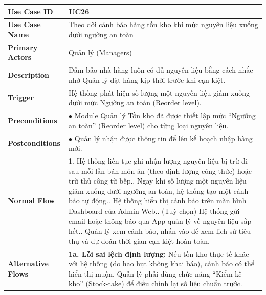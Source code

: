 \begin{longtable}{|L{3.5cm}|L{12.5cm}|}
\hline
\textbf{Use Case ID} & UC26 \\ \hline
\textbf{Use Case Name} & Theo dõi cảnh báo hàng tồn kho khi mức nguyên liệu xuống dưới ngưỡng an toàn \\ \hline
\textbf{Primary Actors} & Quản lý (Managers) \\ \hline
\textbf{Description} & Đảm bảo nhà hàng luôn có đủ nguyên liệu bằng cách nhắc nhở Quản lý đặt hàng kịp thời trước khi cạn kiệt. \\ \hline
\textbf{Trigger} & Hệ thống phát hiện số lượng một nguyên liệu giảm xuống dưới mức Ngưỡng an toàn (Reorder level). \\ \hline
\textbf{Preconditions} & $\bullet$ Module Quản lý Tồn kho đã được thiết lập mức ``Ngưỡng an toàn'' (Reorder level) cho từng loại nguyên liệu. \\ \hline
\textbf{Postconditions} & $\bullet$ Quản lý nhận được thông tin để lên kế hoạch nhập hàng mới. \\ \hline
\textbf{Normal Flow} &
1. Hệ thống liên tục ghi nhận lượng nguyên liệu bị trừ đi sau mỗi lần bán món ăn (theo định lượng công thức) hoặc trừ thủ công từ bếp.. Ngay khi số lượng một nguyên liệu giảm xuống dưới ngưỡng an toàn, hệ thống tạo một cảnh báo tự động.. Hệ thống hiển thị cảnh báo trên màn hình Dashboard của Admin Web.. (Tuỳ chọn) Hệ thống gửi email hoặc thông báo qua App quản lý về nguyên liệu sắp hết.. Quản lý xem cảnh báo, nhấn vào để xem lịch sử tiêu thụ và dự đoán thời gian cạn kiệt hoàn toàn. \\ \hline
\textbf{Alternative Flows} &
\textbf{1a. Lỗi sai lệch định lượng:} Nếu tồn kho thực tế khác với hệ thống (do hao hụt không khai báo), cảnh báo có thể hiển thị muộn. Quản lý phải dùng chức năng ``Kiểm kê kho'' (Stock-take) để điều chỉnh lại số liệu chuẩn trước. \\ \hline
\end{longtable}

